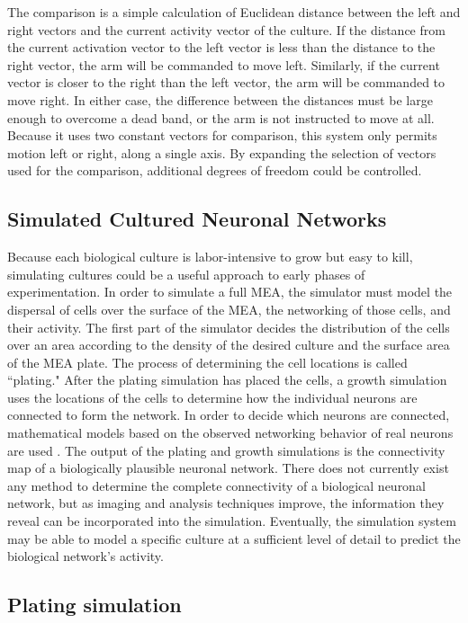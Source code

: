 \documentclass[letterpaper]{article}
\begin{document}
The comparison is a simple calculation of Euclidean distance between the left and right vectors and the current activity vector of the culture. 
If the distance from the current activation vector to the left vector is less than the distance to the right vector, the arm will be commanded to move left. 
Similarly, if the current vector is closer to the right than the left vector, the arm will be commanded to move right. 
In either case, the difference between the distances must be large enough to overcome a dead band, or the arm is not instructed to move at all. 
Because it uses two constant vectors for comparison, this system only permits motion left or right, along a single axis. 
By expanding the selection of vectors used for the comparison, additional degrees of freedom could be controlled. 

\subsection{Simulated Cultured Neuronal Networks}

Because each biological culture is labor-intensive to grow but easy to kill, simulating cultures could be a useful approach to early phases of experimentation. 
In order to simulate a full MEA, the simulator must model the dispersal of cells over the surface of the MEA, the networking of those cells, and their activity. 
The first part of the simulator decides the distribution of the cells over an area according to the density of the desired culture and the surface area of the MEA plate. 
The process of determining the cell locations is called ``plating."
After the plating simulation has placed the cells, a growth simulation uses the locations of the cells to determine how the individual neurons are connected to form the network. 
In order to decide which neurons are connected, mathematical models based on the observed networking behavior of real neurons are used \cite{abe2013control}. 
The output of the plating and growth simulations is the connectivity map of a biologically plausible neuronal network.
There does not currently exist any method to determine the complete connectivity of a biological neuronal network, but as imaging and analysis techniques improve, the information they reveal can be incorporated into the simulation. 
Eventually, the simulation system may be able to model a specific culture at a sufficient level of detail to predict the biological network's activity.

\subsection{Plating simulation}
\end{document}
